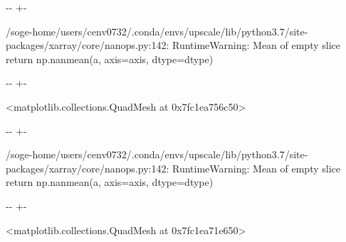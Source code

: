 \documentclass[letterpaper,10pt,english]{sphinxmanual}
\newlength\nbsphinxcodecellspacing
\begin{document}
{

\kern-\sphinxverbatimsmallskipamount\kern-\baselineskip
\kern+\FrameHeightAdjust\kern-\fboxrule
\vspace{\nbsphinxcodecellspacing}

\begin{sphinxVerbatim}[commandchars=\\\{\}]
/soge-home/users/cenv0732/.conda/envs/upscale/lib/python3.7/site-packages/xarray/core/nanops.py:142: RuntimeWarning: Mean of empty slice
  return np.nanmean(a, axis=axis, dtype=dtype)
\end{sphinxVerbatim}
}

{

\kern-\sphinxverbatimsmallskipamount\kern-\baselineskip
\kern+\FrameHeightAdjust\kern-\fboxrule
\vspace{\nbsphinxcodecellspacing}

\begin{sphinxVerbatim}[commandchars=\\\{\}]
\llap{\color{nbsphinxout}[30]:\,\hspace{\fboxrule}\hspace{\fboxsep}}<matplotlib.collections.QuadMesh at 0x7fc1ea756c50>
\end{sphinxVerbatim}
}

{

\kern-\sphinxverbatimsmallskipamount\kern-\baselineskip
\kern+\FrameHeightAdjust\kern-\fboxrule
\vspace{\nbsphinxcodecellspacing}

\begin{sphinxVerbatim}[commandchars=\\\{\}]
/soge-home/users/cenv0732/.conda/envs/upscale/lib/python3.7/site-packages/xarray/core/nanops.py:142: RuntimeWarning: Mean of empty slice
  return np.nanmean(a, axis=axis, dtype=dtype)
\end{sphinxVerbatim}
}

{

\kern-\sphinxverbatimsmallskipamount\kern-\baselineskip
\kern+\FrameHeightAdjust\kern-\fboxrule
\vspace{\nbsphinxcodecellspacing}

\begin{sphinxVerbatim}[commandchars=\\\{\}]
\llap{\color{nbsphinxout}[30]:\,\hspace{\fboxrule}\hspace{\fboxsep}}<matplotlib.collections.QuadMesh at 0x7fc1ea71e650>
\end{sphinxVerbatim}
}
\end{document}
